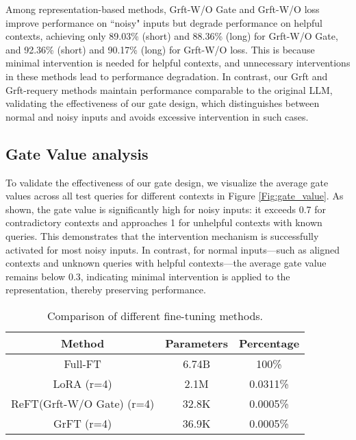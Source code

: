 Among representation-based methods, Grft-W/O Gate and Grft-W/O loss improve performance on ``noisy" inputs but degrade performance on helpful contexts, achieving only 89.03\% (short) and 88.36\% (long) for Grft-W/O Gate, and 92.36\% (short) and 90.17\% (long) for Grft-W/O loss. This is because minimal intervention is needed for helpful contexts, and unnecessary interventions in these methods lead to performance degradation. In contrast, our Grft and Grft-requery methods maintain performance comparable to the original LLM, validating the effectiveness of our gate design, which distinguishes between normal and noisy inputs and avoids excessive intervention in such cases.
\subsection{Gate Value analysis}
To validate the effectiveness of our gate design, we visualize the average gate values across all test queries for different contexts in Figure \ref{Fig:gate_value}. As shown, the gate value is significantly high for noisy inputs: it exceeds 0.7 for contradictory contexts and approaches 1 for unhelpful contexts with known queries. This demonstrates that the intervention mechanism is successfully activated for most noisy inputs. In contrast, for normal inputs—such as aligned contexts and unknown queries with helpful contexts—the average gate value remains below 0.3, indicating minimal intervention is applied to the representation, thereby preserving performance.


\begin{table}[htpb]
  \caption{Comparison of different fine-tuning methods.}
  \small
  \label{table:ft-comparison}
  \centering
  \renewcommand{\arraystretch}{1.2}
  \begin{tabular}{c|c|c} 
    \hline
    \textbf{Method} & \textbf{Parameters} & \textbf{Percentage} \\ 
    \hline\hline
    Full-FT & 6.74B & 100\% \\ 
    \hline
    LoRA (r=4) & 2.1M & 0.0311\% \\
    \hline
    ReFT(Grft-W/O Gate) (r=4) & 32.8K & 0.0005\% \\
    \hline
    GrFT (r=4) & 36.9K & 0.0005\% \\
    \hline
  \end{tabular}
  \vspace{-0.5cm}
\end{table}

